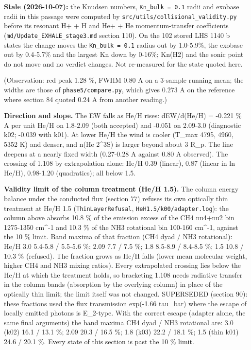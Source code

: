 \documentclass[english,a4paper]{my_memo}
\begin{document}
\textbf{Stale (2026-10-07):} the Knudsen numbers, \texttt{Kn\_bulk\ =\ 0.1} radii and exobase radii in this passage were computed by \texttt{src/utils/collisional\_validity.py} before its resonant H+ + H and He+ + He momentum-transfer coefficients (\texttt{md/Update\_EXHALE\_stage3.md} section 110). On the 102 stored LHS 1140 b states the change moves the \texttt{Kn\_bulk\ =\ 0.1} radius out by 1.0-5.9\%, the exobase out by 0.4-5.7\% and the largest Kn down by 0-16\%; Kn(H2) and the sonic point do not move and no verdict changes. Not re-measured for the state quoted here.

(Observation: red peak 1.28 \%, FWHM 0.80 A on a 3-sample running mean; the
widths are those of \texttt{phase5/compare.py}, which gives 0.273 A on the
reference where section 84 quoted 0.24 A from another reading.)

\textbf{Direction and slope.} The EW falls as He/H rises: dEW/d(He/H) = -0.221
\% A per unit He/H on 1.8-2.09 (both accepted) and -0.051 on 2.09-3.0
(diagnostic k02; -0.039 with k01). At lower He/H the wind is cooler
(T\_max 4795, 4960, 5352 K) and denser, and n(He 2\^{}3S) is larger beyond
about 3 R\_p. The line deepens at a nearly fixed width (0.27-0.28 A against
0.80 A observed). The crossing of 1.108 by extrapolation alone: He/H 0.39
(linear), 0.87 (linear in ln He/H), 0.98-1.20 (quadratics); all below 1.5.

\textbf{Validity limit of the column treatment (He/H 1.5).} The column energy
balance under the conducted flux (section 77) refuses its own optically
thin treatment at He/H 1.5 (\texttt{ThinLayerRefusal}, \texttt{HeH1.5/k00/adapter.log}):
the column above absorbs 10.8 \% of the emission excess of the CH4 nu4+nu2
bin 1275-1350 cm\^{}-1 and 10.3 \% of the NH3 rotational bin 100-160 cm\^{}-1,
against the 10 \% limit. Band maxima of that fraction (CH4 dyad / NH3
rotational): He/H 3.0 5.4-5.8 / 5.5-5.6 \%; 2.09 7.7 / 7.5 \%; 1.8 8.5-8.9 /
8.4-8.5 \%; 1.5 10.8 / 10.3 \% (refused). The fraction grows as He/H falls
(lower mean molecular weight, higher CH4 and NH3 mixing ratios). Every
extrapolated crossing lies below the He/H at which the treatment holds, so
bracketing 1.108 needs radiative transfer in the column bands (absorption
by the overlying column) in place of the optically thin limit; the limit
itself was not changed.
SUPERSEDED (section 90): these fractions used the flux transmission
exp(-1.66 tau\_bar) where the escape of locally emitted photons is E\_2-type.
With the correct escape (adapter alone, the same final arguments) the band
maxima CH4 dyad / NH3 rotational are: 3.0 (k02) 16.1 / 13.1 \%; 2.09 20.3 /
16.5 \%; 1.8 (k03) 22.2 / 18.1 \%; 1.5 (thin k01) 24.6 / 20.1 \%. Every state
of this section is past the 10 \% limit.
\end{document}
